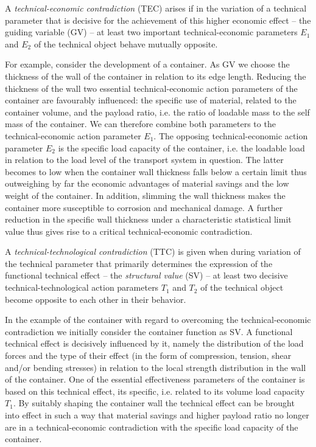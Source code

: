 \documentclass[11pt,a4paper]{article}
\begin{document}
A \emph{technical-economic contradiction} (TEC) arises if in the variation of
a technical parameter that is decisive for the achievement of this higher
economic effect -- the guiding variable (GV) -- at least two important
technical-economic parameters $E_1$ and $E_2$ of the technical object behave
mutually opposite.

For example, consider the development of a container. As GV we choose the
thickness of the wall of the container in relation to its edge length.
Reducing the thickness of the wall two essential technical-economic action
parameters of the container are favourably influenced: the specific use of
material, related to the container volume, and the payload ratio, i.e. the
ratio of loadable mass to the self mass of the container.  We can therefore
combine both parameters to the technical-economic action parameter $E_1$. The
opposing technical-economic action parameter $E_2$ is the specific load
capacity of the container, i.e. the loadable load in relation to the load
level of the transport system in question. The latter becomes to low when the
container wall thickness falls below a certain limit thus outweighing by far
the economic advantages of material savings and the low weight of the
container. In addition, slimming the wall thickness makes the container more
susceptible to corrosion and mechanical damage. A further reduction in the
specific wall thickness under a characteristic statistical limit value thus
gives rise to a critical technical-economic contradiction.

A \emph{technical-technological contradiction} (TTC) is given when during
variation of the technical parameter that primarily determines the expression
of the functional technical effect -- the \emph{structural value} (SV) -- at
least two decisive technical-technological action parameters $T_1$ and $T_2$
of the technical object become opposite to each other in their behavior.

In the example of the container with regard to overcoming the
technical-economic contradiction we initially consider the container function
as SV.  A functional technical effect is decisively influenced by it, namely
the distribution of the load forces and the type of their effect (in the form
of compression, tension, shear and/or bending stresses) in relation to the
local strength distribution in the wall of the container. One of the essential
effectiveness parameters of the container is based on this technical effect,
its specific, i.e. related to its volume load capacity $T_1$. By suitably
shaping the container wall the technical effect can be brought into effect in
such a way that material savings and higher payload ratio no longer are in a
technical-economic contradiction with the specific load capacity of the
container.
\end{document}
